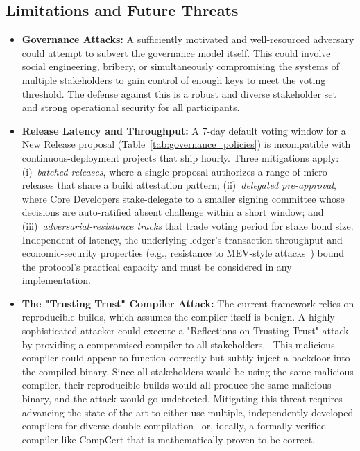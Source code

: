 \documentclass{article}
\begin{document}
\subsection{Limitations and Future Threats}

\begin{itemize}
\item \textbf{Governance Attacks:} A sufficiently motivated and well-resourced adversary could attempt to subvert the governance model itself. This could involve social engineering, bribery, or simultaneously compromising the systems of multiple stakeholders to gain control of enough keys to meet the voting threshold. The defense against this is a robust and diverse stakeholder set and strong operational security for all participants.
\item \textbf{Release Latency and Throughput:} A 7-day default voting window for a New Release proposal (Table~\ref{tab:governance_policies}) is incompatible with continuous-deployment projects that ship hourly. Three mitigations apply: (i)~\emph{batched releases}, where a single proposal authorizes a range of micro-releases that share a build attestation pattern; (ii)~\emph{delegated pre-approval}, where Core Developers stake-delegate to a smaller signing committee whose decisions are auto-ratified absent challenge within a short window; and (iii)~\emph{adversarial-resistance tracks} that trade voting period for stake bond size. Independent of latency, the underlying ledger's transaction throughput and economic-security properties (e.g., resistance to MEV-style attacks~\cite{daian2020flash}) bound the protocol's practical capacity and must be considered in any implementation.
\item \textbf{The "Trusting Trust" Compiler Attack:} The current framework relies on reproducible builds, which assumes the compiler itself is benign. A highly sophisticated attacker could execute a "Reflections on Trusting Trust" attack by providing a compromised compiler to all stakeholders.~\cite{thompson1984trusting} This malicious compiler could appear to function correctly but subtly inject a backdoor into the compiled binary. Since all stakeholders would be using the same malicious compiler, their reproducible builds would all produce the same malicious binary, and the attack would go undetected. Mitigating this threat requires advancing the state of the art to either use multiple, independently developed compilers for diverse double-compilation~\cite{wheeler2005diverse} or, ideally, a formally verified compiler like CompCert that is mathematically proven to be correct.~\cite{leroy2009compcert}
\end{itemize}
\end{document}
